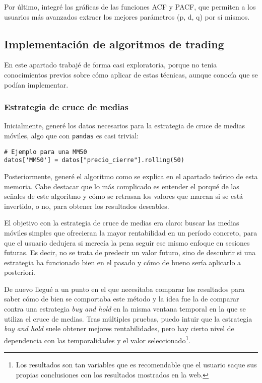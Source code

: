 Por último, integré las gráficas de las funciones ACF y PACF, que permiten a los usuarios más avanzados extraer los mejores parámetros (p, d, q) por sí mismos. 

\subsection{Implementación de algoritmos de trading}

En este apartado trabajé de forma casi exploratoria, porque no tenia conocimientos previos sobre cómo aplicar de estas técnicas, aunque conocía que se podían implementar.

\subsubsection{Estrategia de cruce de medias}

Inicialmente, generé los datos necesarios para la estrategia de cruce de medias móviles, algo que con \texttt{pandas} es casi trivial:

\begin{verbatim}
# Ejemplo para una MM50
datos['MM50'] = datos["precio_cierre"].rolling(50)
\end{verbatim} 

Posteriormente, generé el algoritmo como se explica en el apartado teórico de esta memoria. Cabe destacar que lo más complicado es entender el porqué de las señales de este algoritmo y cómo se retrasan los valores que marcan si se está invertido, o no, para obtener los resultados deseables. 

El objetivo con la estrategia de cruce de medias era claro: buscar las medias móviles simples que ofrecieran la mayor rentabilidad en un período concreto, para que el usuario dedujera si merecía la pena seguir ese mismo enfoque en sesiones futuras. Es decir, no se trata de predecir un valor futuro, sino de descubrir si una estrategia ha funcionado bien en el pasado y cómo de bueno sería aplicarlo a posteriori. 

De nuevo llegué a un punto en el que necesitaba comparar los resultados para saber cómo de bien se comportaba este método y la idea fue la de comparar contra una estrategia \emph{buy and hold} en la misma ventana temporal en la que se utiliza el cruce de medias. Tras múltiples pruebas, puedo intuir que la estrategia \emph{buy and hold} suele obtener mejores rentabilidades, pero hay cierto nivel de dependencia con las temporalidades y el valor seleccionado\footnote{Los resultados son tan variables que es recomendable que el usuario saque sus propias conclusiones con los resultados mostrados en la web.}.   

